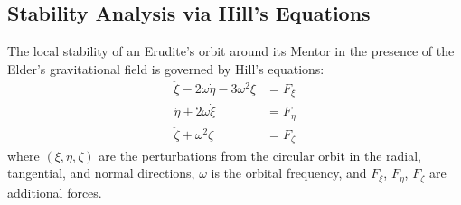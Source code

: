 \subsection{Stability Analysis via Hill's Equations}

\begin{theorem}
The local stability of an Erudite's orbit around its Mentor in the presence of the Elder's gravitational field is governed by Hill's equations:
\begin{align}
\ddot{\xi} - 2\omega\dot{\eta} - 3\omega^2\xi &= F_{\xi} \\
\ddot{\eta} + 2\omega\dot{\xi} &= F_{\eta} \\
\ddot{\zeta} + \omega^2\zeta &= F_{\zeta}
\end{align}
where $(\xi, \eta, \zeta)$ are the perturbations from the circular orbit in the radial, tangential, and normal directions, $\omega$ is the orbital frequency, and $F_{\xi}$, $F_{\eta}$, $F_{\zeta}$ are additional forces.
\end{theorem}

